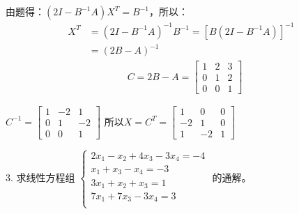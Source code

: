 \documentclass{article}
\begin{document}
\begin{jie}
由题得：$(2I-B^{-1}A)X^{T}=B^{-1}$，所以：
\begin{align*}
X^{T}&=(2I-B^{-1}A)^{-1}B^{-1}=[B(2I-B^{-1}A)]^{-1}\\
&=(2B-A)^{-1}
\end{align*}
\begin{align*}
&C=2B-A=\begin{bmatrix}
  1 & 2 & 3 \\
  0 & 1 & 2 \\
  0 & 0 & 1
\end{bmatrix}
\end{align*}

$C^{-1}=\begin{bmatrix}
  1 & -2 & 1 \\
  0 & 1 & -2 \\
  0 & 0 & 1
\end{bmatrix}$
所以$X=C^{T}=\begin{bmatrix}
  1 & 0 & 0 \\
  -2 & 1 & 0 \\
  1 & -2 & 1
\end{bmatrix}$
\end{jie}

3. 求线性方程组
$
\begin{cases}
 2x_{1}-x_{2}+4x_{3}-3x_{4}=-4\\
 x_{1}+x_{3}-x_{4}=-3\\
 3x_{1}+x_{2}+x_{3}=1\\
 7x_{1}+7x_{3}-3x_{4}=3\\
\end{cases}
$
的通解。
\end{document}
